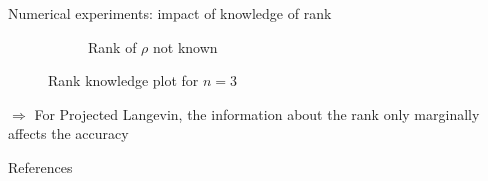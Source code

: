 \documentclass{beamer}
\begin{document}
\begin{frame}{Numerical experiments: impact of knowledge of rank}
\begin{figure}[H]
\begin{subfigure}[b]{0.49\textwidth}
            \caption{Rank of $\rho$ not known}
    
            \label{fig:rank-no-info-sub}
    
        \end{subfigure}
    
        \caption{Rank knowledge plot for $n=3$}
    
        \label{fig:rank-info}
    
    \end{figure}
    $\Longrightarrow$ For Projected Langevin, the information about the rank only marginally affects the accuracy
\end{frame}
\begin{frame}
    
\end{frame}
\begin{frame}{References}
    \printbibliography
\end{frame}
\end{document}

